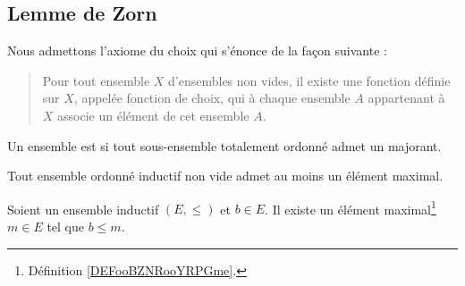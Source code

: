 \subsection{Lemme de Zorn}

Nous admettons l'axiome du choix qui s'énonce de la façon suivante\cite{BIBooTQMWooFFAQQZ} :
\begin{quote}
	Pour tout ensemble \( X\) d'ensembles non vides, il existe une fonction définie sur \( X\), appelée fonction de choix, qui à chaque ensemble \( A\) appartenant à \( X\) associe un élément de cet ensemble \( A\).
\end{quote}

\begin{definition}  \label{DefGHDfyyz}
	Un ensemble est  si tout sous-ensemble totalement ordonné admet un majorant.
\end{definition}


\begin{lemma}    \label{LemUEGjJBc}
	Tout ensemble ordonné inductif non vide admet au moins un élément maximal.
\end{lemma}

\begin{proposition}       \label{PROPooFOETooWYLOeq}
	Soient un ensemble inductif \( (E,\leq)\) et \( b\in E\). Il existe un élément maximal\footnote{Définition \ref{DEFooBZNRooYRPGme}.} \( m\in E\) tel que \( b\leq m\).
\end{proposition}

